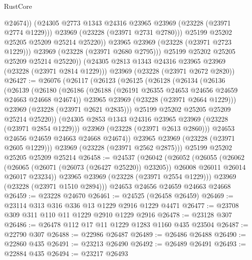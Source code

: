 \begin{lexlean}{RustCore}
\begin{coremodule}
                      @24674))
                  (@24305 @2773 @1343 @24316 @23965 @23969 (@23228 (@23971 @2774 @1229)))
                  @23969
                  (@23228 (@23971 @2731 @2780)))
                @25199
                @25202
                @25205
                @25209
                @25214
                @25220))
            @23965
            @23969
            (@23228 (@23971 @2723 @1229)))
          @23969
          (@23228 (@23971 @2680 @2795)))
        @25199
        @25202
        @25205
        @25209
        @25214
        @25220))
    (@24305 @2813 @1343 @24316 @23965 @23969 (@23228 (@23971 @2814 @1229)))
    @23969
    (@23228 (@23971 @2672 @2820))
@26427 := @26076
    (@26117
      (@26123
        (@26125
          (@26128
            (@26134
              (@26136
                (@26139
                  (@26180
                    (@26186
                      (@26188 (@26191 @26355 @24653 @24656 @24659 @24663 @24668 @24674))
                      @23965
                      @23969
                      (@23228 (@23971 @2664 @1229)))
                    @23969
                    (@23228 (@23971 @2621 @2835)))
                  @25199
                  @25202
                  @25205
                  @25209
                  @25214
                  @25220))
              (@24305 @2853 @1343 @24316 @23965 @23969 (@23228 (@23971 @2854 @1229)))
              @23969
              (@23228 (@23971 @2613 @2860)))
            @24653
            @24656
            @24659
            @24663
            @24668
            @24674))
        @23965
        @23969
        (@23228 (@23971 @2605 @1229)))
      @23969
      (@23228 (@23971 @2562 @2875)))
    @25199
    @25202
    @25205
    @25209
    @25214
@26458 := @24537
    (@26042
      (@26052
        (@26055
          (@26062
            (@26065 (@26071 (@26073 (@26427 @25220)) @23205))
            @26008
            @26011
            @26014
            @26017
            @23234))
        @23965
        @23969
        (@23228 (@23971 @2554 @1229)))
      @23969
      (@23228 (@23971 @1510 @2894)))
    @24653
    @24656
    @24659
    @24663
    @24668
@26459 := @23228 @24670
@26461 := @24525 (@26458 @26459)
@26469 := @23114 @313 @316 @336 @13 @1229 @2916 @1229 @4471
@26477 := @23708 @309 @311 @110 @11 @1229 @2910 @1229 @2916
@26478 := @23128 @307
@26486 := @26478 @112 @17 @11 @1229 @1283 @1160 @435 @23504
@26487 := @22790 @307
@26488 := @22986 @26487
@26489 := @26486 @26488
@26490 := @22860 @435
@26491 := @23213 @26490
@26492 := @26489 @26491
@26493 := @22884 @435
@26494 := @23217 @26493

\end{coremodule}
\end{lexlean}

